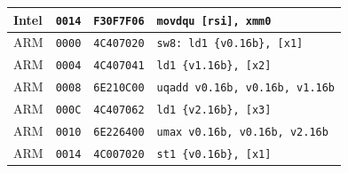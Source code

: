 \begin{table}[htbp]
\begin{tabular}{@{}l|l|l|p{7.2cm}@{}}
Intel & \texttt{0014} & \texttt{F30F7F06} & \texttt{movdqu [rsi], xmm0} \\
\midrule
ARM & \texttt{0000} & \texttt{4C407020} & \texttt{sw8: ld1 \{v0.16b\}, [x1]} \\
ARM & \texttt{0004} & \texttt{4C407041} & \texttt{ld1 \{v1.16b\}, [x2]} \\
ARM & \texttt{0008} & \texttt{6E210C00} & \texttt{uqadd v0.16b, v0.16b, v1.16b} \\
ARM & \texttt{000C} & \texttt{4C407062} & \texttt{ld1 \{v2.16b\}, [x3]} \\
ARM & \texttt{0010} & \texttt{6E226400} & \texttt{umax v0.16b, v0.16b, v2.16b} \\
ARM & \texttt{0014} & \texttt{4C007020} & \texttt{st1 \{v0.16b\}, [x1]} \\
\bottomrule
\end{tabular}
\endgroup
\end{table}
\noindent{}\par
